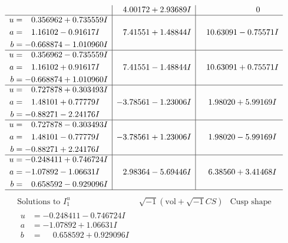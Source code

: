 \documentclass[1p]{elsarticle_modified}
\theoremstyle{definition}
\newcommand{\I}{\sqrt{-1}}
\begin{document}
$$\begin{array}{c|c|c}
 & \phantom{-}4.00172 + 2.93689 I & \phantom{-0.000000 } 0 \\ \hline\begin{aligned}
u &= \phantom{-}0.356962 + 0.735559 I \\
a &= \phantom{-}1.16102 - 0.91617 I \\
b &= -0.668874 - 1.010960 I\end{aligned}
 & \phantom{-}7.41551 + 1.48844 I & \phantom{-}10.63091 - 0.75571 I \\ \hline\begin{aligned}
u &= \phantom{-}0.356962 - 0.735559 I \\
a &= \phantom{-}1.16102 + 0.91617 I \\
b &= -0.668874 + 1.010960 I\end{aligned}
 & \phantom{-}7.41551 - 1.48844 I & \phantom{-}10.63091 + 0.75571 I \\ \hline\begin{aligned}
u &= \phantom{-}0.727878 + 0.303493 I \\
a &= \phantom{-}1.48101 + 0.77779 I \\
b &= -0.88271 - 2.24176 I\end{aligned}
 & -3.78561 - 1.23006 I & \phantom{-}1.98020 + 5.99169 I \\ \hline\begin{aligned}
u &= \phantom{-}0.727878 - 0.303493 I \\
a &= \phantom{-}1.48101 - 0.77779 I \\
b &= -0.88271 + 2.24176 I\end{aligned}
 & -3.78561 + 1.23006 I & \phantom{-}1.98020 - 5.99169 I \\ \hline\begin{aligned}
u &= -0.248411 + 0.746724 I \\
a &= -1.07892 - 1.06631 I \\
b &= \phantom{-}0.658592 - 0.929096 I\end{aligned}
 & \phantom{-}2.98364 - 5.69446 I & \phantom{-}6.38560 + 3.41468 I\\
 \hline 
 \end{array}$$\newpage$$\begin{array}{c|c|c}  
\text{Solutions to }I^u_{1}& \I (\text{vol} + \sqrt{-1}CS) & \text{Cusp shape}\\
 \hline 
\begin{aligned}
u &= -0.248411 - 0.746724 I \\
a &= -1.07892 + 1.06631 I \\
b &= \phantom{-}0.658592 + 0.929096 I\end{aligned}

\end{array}$$
\end{document}
